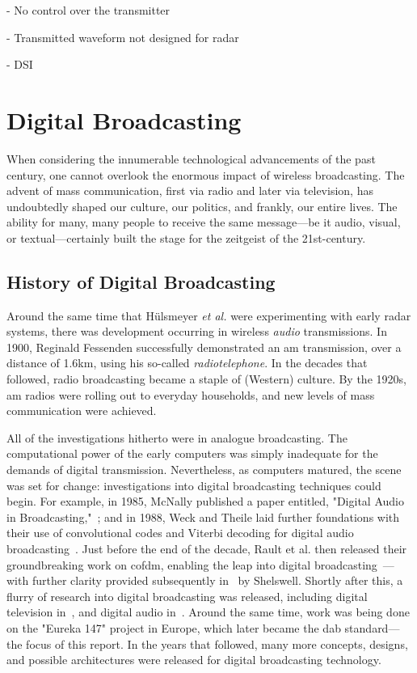 \documentclass[class=report,11pt,crop=false]{standalone}
\begin{document}
- No control over the transmitter

- Transmitted waveform not designed for radar

- DSI

\section{Digital Broadcasting}
When considering the innumerable technological advancements of the past century, one cannot overlook the enormous impact of wireless broadcasting. The advent of mass communication, first via radio and later via television, has undoubtedly shaped our culture, our politics, and frankly, our entire lives. The ability for many, many people to receive the same message---be it audio, visual, or textual---certainly built the stage for the zeitgeist of the 21st-century.

\subsection{History of Digital Broadcasting}
Around the same time that H\"ulsmeyer \emph{et al.} were experimenting with early radar systems, there was development occurring in wireless \emph{audio} transmissions. In 1900, Reginald Fessenden successfully demonstrated an \gls{am} transmission, over a distance of 1.6km, using his so-called \emph{radiotelephone}. In the decades that followed, radio broadcasting became a staple of (Western) culture. By the 1920s, \gls{am} radios were rolling out to everyday households, and new levels of mass communication were achieved.

All of the investigations hitherto were in analogue broadcasting. The computational power of the early computers was simply inadequate for the demands of digital transmission. Nevertheless, as computers matured, the scene was set for change: investigations into digital broadcasting techniques could begin. For example, in 1985, McNally published a paper entitled, "Digital Audio in Broadcasting,"~\cite{McNally1985}; and in 1988, Weck and Theile laid further foundations with their use of convolutional codes and Viterbi decoding for digital audio broadcasting~\cite{weck1988dab}. Just before the end of the decade, Rault et al. then released their groundbreaking work on \gls{cofdm}, enabling the leap into digital broadcasting~\cite{Raulta}---with further clarity provided subsequently in~\cite{Shelswell1995} by Shelswell. Shortly after this, a flurry of research into digital broadcasting was released, including digital television in~\cite{Bernard1992, stare1992}, and digital audio in~\cite{shelswell1991, Price1992, Maddocks1992}. Around the same time, work was being done on the "Eureka 147" project in Europe, which later became the \gls{dab} standard---the focus of this report. In the years that followed, many more concepts, designs, and possible architectures were released for digital broadcasting technology.
\end{document}
